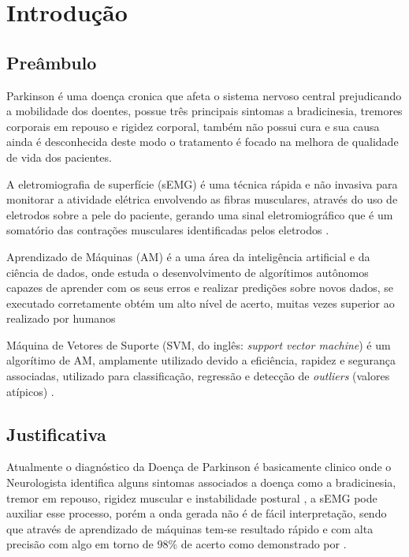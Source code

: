 \chapter[Introdução]{Introdução}
\section{Preâmbulo}
Parkinson é uma doença cronica que afeta o sistema nervoso central prejudicando a mobilidade dos doentes, possue três principais sintomas a bradicinesia, tremores corporais em repouso e rigidez corporal, também não possui cura e sua causa ainda é desconhecida deste modo o tratamento é focado na melhora de qualidade de vida dos pacientes\cite{da2016aspectos}.

A eletromiografia de superfície (sEMG) é uma técnica rápida e não invasiva para monitorar a atividade elétrica envolvendo as fibras musculares, através do uso de eletrodos sobre a pele do paciente, gerando uma sinal eletromiográfico que é um somatório das contrações musculares identificadas pelos eletrodos \cite{de2010eletromiografia}.

Aprendizado de Máquinas (AM) é a uma área da inteligência artificial e da ciência de dados, onde estuda o desenvolvimento de algorítimos autônomos capazes de aprender com os seus erros e realizar predições sobre novos dados, se executado corretamente obtém um alto nível de acerto, muitas vezes superior ao realizado por humanos \cite{Kohavi}

Máquina de Vetores de Suporte (SVM, do inglês: \textit{support vector machine}) é um algorítimo de AM, amplamente utilizado devido a eficiência, rapidez e segurança associadas, utilizado para classificação, regressão e detecção de \textit{outliers} (valores atípicos) \cite{scikit-learn}.

\section{Justificativa}
Atualmente o diagnóstico da Doença de Parkinson é basicamente clinico onde o Neurologista identifica alguns sintomas associados a doença como a bradicinesia, tremor em repouso, rigidez muscular e instabilidade postural \cite{gago2014manual}, a sEMG pode auxiliar esse processo, porém a onda gerada não é de fácil interpretação, sendo que através de aprendizado de máquinas tem-se resultado rápido e com alta precisão com algo em torno de 98\% de acerto como demonstrado por . 

